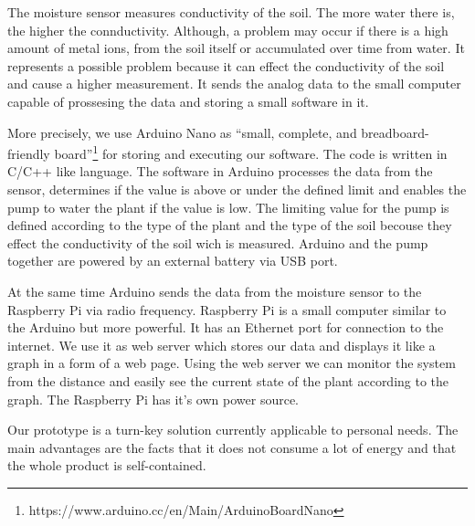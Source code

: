 \documentclass[conference]{IEEEtran}
\begin{document}

The moisture sensor measures conductivity of the soil.
The more water there is, the higher the connductivity.
Although, a problem may occur if there is a high amount of metal ions, from the soil itself or accumulated over time from water.
It represents a possible problem because it can effect the conductivity of the soil and cause a higher measurement.
It sends the analog data to the small computer capable of prossesing the data and storing a small software in it.


More precisely, we use Arduino Nano as ``small, complete, and breadboard-friendly board''\footnote{https://www.arduino.cc/en/Main/ArduinoBoardNano} for storing and executing our software.
The code is written in C/C++ like language.
The software in Arduino processes the data from the sensor, determines if the value is above or under the defined limit and enables the pump to water the plant if the value is low.
The limiting value for the pump is defined according to the type of the plant and the type of the soil becouse they effect the conductivity of the soil wich is measured.
Arduino and the pump together are powered by an external battery via USB port.


At the same time Arduino sends the data from the moisture sensor to the Raspberry Pi via radio frequency.
Raspberry Pi is a small computer similar to the Arduino but more powerful.
It has an Ethernet port for connection to the internet.
We use it as web server which stores our data and displays it like a graph in a form of a web page.
Using the web server we can monitor the system from the distance and easily see the current state of the plant according to the graph.
The Raspberry Pi has it's own power source.


Our prototype is a turn-key solution currently applicable to personal needs.
The main advantages are the facts that it does not consume a lot of energy and that the whole product is self-contained.
\end{document}
